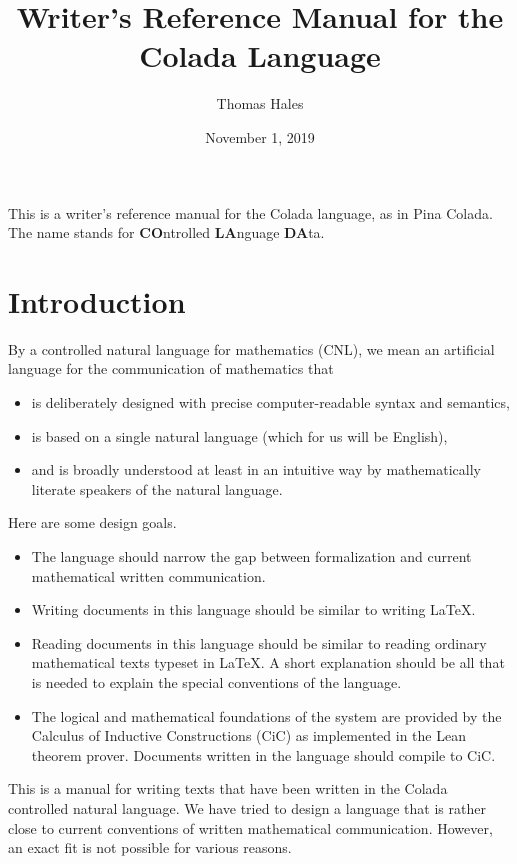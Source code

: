 \documentclass[12pt]{article}
\title{Writer's Reference Manual for the Colada Language}
\date{November 1, 2019}
\author{Thomas Hales}
\numberwithin{definition}{section}
\begin{document}
\maketitle

\setcounter{tocdepth}{2}
\tableofcontents
\newpage

\newcommand{\Nat}{{\mathbb N}}
\newcommand{\Int}{{\mathbb Z}}
\newcommand{\Real}{{\mathbb R}}
\newcommand{\tmid}{//}

This is a writer's reference manual for the Colada language, as in Pina Colada.  The name
stands for {\bf CO}ntrolled {\bf LA}nguage {\bf DA}ta.

\section{Introduction}


By a controlled natural language for mathematics (CNL), we mean an
artificial language for the communication of mathematics that
\begin{itemize}
\item is deliberately designed with precise computer-readable syntax
  and semantics,
\item is based on a single natural language (which for us will be
  English),
\item and is broadly understood at least in an intuitive way by
  mathematically literate speakers of the natural language.
\end{itemize}




Here are some design goals.
\begin{itemize}
\item The language should narrow the gap between formalization and
  current mathematical written communication.
\item Writing documents in this language should be similar to writing
  \LaTeX.
\item Reading documents in this language should be similar to reading
  ordinary mathematical texts typeset in \LaTeX.  A short explanation
  should be all that is needed to explain the special conventions of
  the language.
\item The logical and mathematical foundations of the system are
  provided by the Calculus of Inductive Constructions (CiC) as
  implemented in the Lean theorem prover.  Documents written in the
  language should compile to CiC.
\end{itemize}


This is a manual for writing texts that have been written in the
Colada controlled natural language.  
We have tried to design a language that is rather close to current
conventions of written mathematical communication.  However, an exact
fit is not possible for various reasons.
\end{document}
